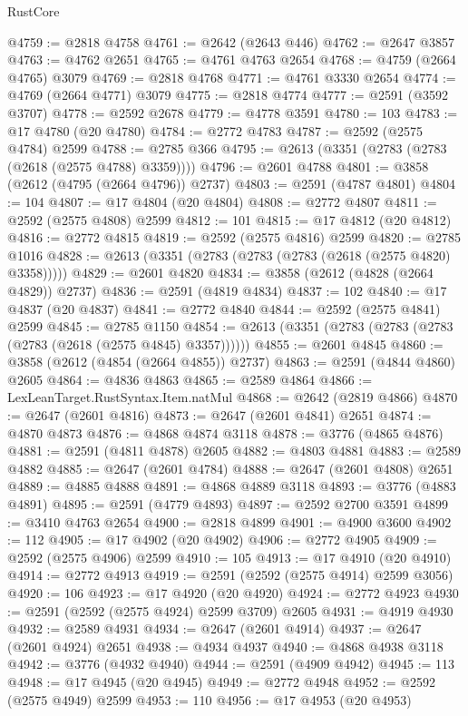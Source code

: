 \begin{lexlean}{RustCore}
\begin{coremodule}
@4759 := @2818 @4758
@4761 := @2642 (@2643 @446)
@4762 := @2647 @3857
@4763 := @4762 @2651
@4765 := @4761 @4763 @2654
@4768 := @4759 (@2664 @4765) @3079
@4769 := @2818 @4768
@4771 := @4761 @3330 @2654
@4774 := @4769 (@2664 @4771) @3079
@4775 := @2818 @4774
@4777 := @2591 (@3592 @3707)
@4778 := @2592 @2678
@4779 := @4778 @3591
@4780 := 103
@4783 := @17 @4780 (@20 @4780)
@4784 := @2772 @4783
@4787 := @2592 (@2575 @4784) @2599
@4788 := @2785 @366
@4795 := @2613 (@3351 (@2783 (@2783 (@2618 (@2575 @4788) @3359))))
@4796 := @2601 @4788
@4801 := @3858 (@2612 (@4795 (@2664 @4796)) @2737)
@4803 := @2591 (@4787 @4801)
@4804 := 104
@4807 := @17 @4804 (@20 @4804)
@4808 := @2772 @4807
@4811 := @2592 (@2575 @4808) @2599
@4812 := 101
@4815 := @17 @4812 (@20 @4812)
@4816 := @2772 @4815
@4819 := @2592 (@2575 @4816) @2599
@4820 := @2785 @1016
@4828 := @2613 (@3351 (@2783 (@2783 (@2783 (@2618 (@2575 @4820) @3358)))))
@4829 := @2601 @4820
@4834 := @3858 (@2612 (@4828 (@2664 @4829)) @2737)
@4836 := @2591 (@4819 @4834)
@4837 := 102
@4840 := @17 @4837 (@20 @4837)
@4841 := @2772 @4840
@4844 := @2592 (@2575 @4841) @2599
@4845 := @2785 @1150
@4854 := @2613 (@3351 (@2783 (@2783 (@2783 (@2783 (@2618 (@2575 @4845) @3357))))))
@4855 := @2601 @4845
@4860 := @3858 (@2612 (@4854 (@2664 @4855)) @2737)
@4863 := @2591 (@4844 @4860) @2605
@4864 := @4836 @4863
@4865 := @2589 @4864
@4866 := LexLeanTarget.RustSyntax.Item.natMul
@4868 := @2642 (@2819 @4866)
@4870 := @2647 (@2601 @4816)
@4873 := @2647 (@2601 @4841) @2651
@4874 := @4870 @4873
@4876 := @4868 @4874 @3118
@4878 := @3776 (@4865 @4876)
@4881 := @2591 (@4811 @4878) @2605
@4882 := @4803 @4881
@4883 := @2589 @4882
@4885 := @2647 (@2601 @4784)
@4888 := @2647 (@2601 @4808) @2651
@4889 := @4885 @4888
@4891 := @4868 @4889 @3118
@4893 := @3776 (@4883 @4891)
@4895 := @2591 (@4779 @4893)
@4897 := @2592 @2700 @3591
@4899 := @3410 @4763 @2654
@4900 := @2818 @4899
@4901 := @4900 @3600
@4902 := 112
@4905 := @17 @4902 (@20 @4902)
@4906 := @2772 @4905
@4909 := @2592 (@2575 @4906) @2599
@4910 := 105
@4913 := @17 @4910 (@20 @4910)
@4914 := @2772 @4913
@4919 := @2591 (@2592 (@2575 @4914) @2599 @3056)
@4920 := 106
@4923 := @17 @4920 (@20 @4920)
@4924 := @2772 @4923
@4930 := @2591 (@2592 (@2575 @4924) @2599 @3709) @2605
@4931 := @4919 @4930
@4932 := @2589 @4931
@4934 := @2647 (@2601 @4914)
@4937 := @2647 (@2601 @4924) @2651
@4938 := @4934 @4937
@4940 := @4868 @4938 @3118
@4942 := @3776 (@4932 @4940)
@4944 := @2591 (@4909 @4942)
@4945 := 113
@4948 := @17 @4945 (@20 @4945)
@4949 := @2772 @4948
@4952 := @2592 (@2575 @4949) @2599
@4953 := 110
@4956 := @17 @4953 (@20 @4953)

\end{coremodule}
\end{lexlean}
